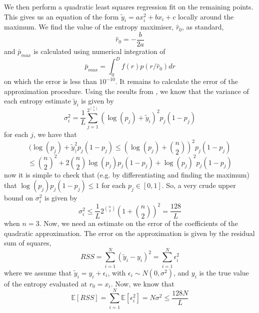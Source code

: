 \documentclass{article}
\begin{document}
We then perform a quadratic least squares regression fit on the remaining points. This gives us an equation of the form $\tilde{y}_i = ax_i^2 + bx_i + c$ locally around the maximum. We find the value of the entropy maximiser, $\hat{r}_0$, as standard, 
\begin{equation}
    \hat{r}_0 = -\frac{b}{2a}
\end{equation}
and $\bar{p}_{max}$ is calculated using numerical integration of
\begin{equation}
    \bar{p}_{max} = \int_0^Df(r)p(r/\hat{r}_0)dr
\end{equation}
on which the error is less than $10^{-10}$. It remains to calculate the error of the approximation procedure. Using the results from \cite{roulston1999estimating}, we know that the variance of each entropy estimate $\tilde{y}_i$ is given by
\begin{equation}
    \sigma_i^2 = \frac{1}{L}\sum_{j=1}^{2^{\binom{n}{2}}} (\log(p_j) + \tilde{y}_i)^2p_j(1-p_j)
\end{equation}
for each $j$, we have that \begin{equation}
    (\log(p_j) + \tilde{y}_)^2p_j(1-p_j) \leq (\log(p_j) + \binom{n}{2})^2p_j(1-p_j)
\end{equation}
\begin{equation}
    \leq \binom{n}{2}^2 + 2\binom{n}{2}\log(p_j)p_j(1-p_j) + \log(p_j)^2p_j(1-p_j) 
\end{equation}
now it is simple to check that (e.g. by differentiating and finding the maximum) that $\log(p_j)p_j(1-p_j) \leq 1$ for each $p_j \in [0,1]$. So, a very crude upper bound on $\sigma_i^2$ is given by
\begin{equation}
    \sigma_i^2 \leq \frac{1}{L} 2^{\binom{n}{2}}\left(1+\binom{n}{2}\right)^2 = \frac{128}{L}
\end{equation}
when $n=3$. Now, we need an estimate on the error of the coefficients of the quadratic approximation. The error on the approximation is given by the residual sum of squares,
\begin{equation}
    RSS = \sum_{i=1}^{N} (\tilde{y}_i - y_i)^2 = \sum_{i=1}^N \epsilon_i^2
\end{equation}
where we assume that $\tilde{y}_i= y_i+\epsilon_i$, with $\epsilon_i \sim N(0,\sigma^2)$, and $y_i$ is the true value of the entropy evaluated at $r_0 = x_i$. Now, we know that
\begin{equation}
    \mathbb{E}[RSS] = \sum_{i=1}^N\mathbb{E}[\epsilon_i^2] = N\sigma^2 \leq \frac{128N}{L}
\end{equation}
\end{document}
